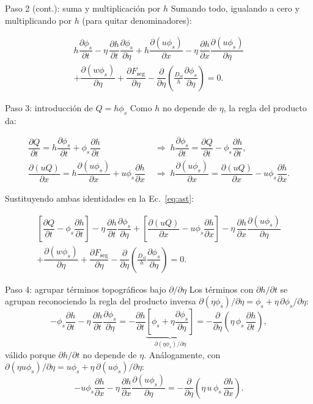 \documentclass[11pt]{beamer}
\newcommand{\pd}[2]{\dfrac{\partial #1}{\partial #2}}
\begin{document}
\begin{frame}{Paso 2 (cont.): suma y multiplicación por $h$}
Sumando todo, igualando a cero y multiplicando por $h$ (para quitar denominadores):
\begin{footnotesize}
\begin{multline}
    h\pd{\phi_s}{t} - \eta\,\pd{h}{t}\pd{\phi_s}{\eta}
    + h\pd{(u\phi_s)}{x} - \eta\,\pd{h}{x}\pd{(u\phi_s)}{\eta} \\
    + \pd{(w\phi_s)}{\eta} + \pd{F_{\mathrm{seg}}}{\eta}
    - \pd{}{\eta}\!\left(\frac{D_{sl}}{h}\pd{\phi_s}{\eta}\right) = 0. \label{eq:ast}
\end{multline}
\end{footnotesize}
\end{frame}

\begin{frame}{Paso 3: introducción de $Q=h\phi_s$}
Como $h$ no depende de $\eta$, la regla del producto da:
\begin{footnotesize}
\begin{align}
    \pd{Q}{t} = h\pd{\phi_s}{t} + \phi_s\pd{h}{t}
    &\;\Longrightarrow\; h\pd{\phi_s}{t} = \pd{Q}{t} - \phi_s\pd{h}{t}, \\
    \pd{(uQ)}{x} = h\pd{(u\phi_s)}{x} + u\phi_s\pd{h}{x}
    &\;\Longrightarrow\; h\pd{(u\phi_s)}{x} = \pd{(uQ)}{x} - u\phi_s\pd{h}{x}.
\end{align}
\end{footnotesize}
Sustituyendo ambas identidades en la Ec.~\eqref{eq:ast}:
\begin{footnotesize}
\begin{multline}
    \left[\pd{Q}{t} - \phi_s\pd{h}{t}\right] - \eta\,\pd{h}{t}\pd{\phi_s}{\eta}
    + \left[\pd{(uQ)}{x} - u\phi_s\pd{h}{x}\right] - \eta\,\pd{h}{x}\pd{(u\phi_s)}{\eta} \\
    + \pd{(w\phi_s)}{\eta} + \pd{F_{\mathrm{seg}}}{\eta}
    - \pd{}{\eta}\!\left(\frac{D_{sl}}{h}\pd{\phi_s}{\eta}\right) = 0.
\end{multline}
\end{footnotesize}
\end{frame}

\begin{frame}{Paso 4: agrupar términos topográficos bajo $\partial/\partial\eta$}
Los términos con $\partial h/\partial t$ se agrupan reconociendo la regla del producto inversa $\partial(\eta\phi_s)/\partial\eta = \phi_s+\eta\,\partial\phi_s/\partial\eta$:
\begin{equation}
    -\phi_s\pd{h}{t} - \eta\,\pd{h}{t}\pd{\phi_s}{\eta}
    = -\pd{h}{t}\underbrace{\left[\phi_s + \eta\pd{\phi_s}{\eta}\right]}_{\partial(\eta\phi_s)/\partial\eta}
    = -\pd{}{\eta}\!\left(\eta\,\phi_s\,\pd{h}{t}\right),
\end{equation}
válido porque $\partial h/\partial t$ no depende de $\eta$. Análogamente, con $\partial(\eta u\phi_s)/\partial\eta = u\phi_s+\eta\,\partial(u\phi_s)/\partial\eta$:
\begin{equation}
    -u\phi_s\pd{h}{x} - \eta\,\pd{h}{x}\pd{(u\phi_s)}{\eta}
    = -\pd{}{\eta}\!\left(\eta\,u\,\phi_s\,\pd{h}{x}\right).
\end{equation}
\end{frame}
\end{document}
